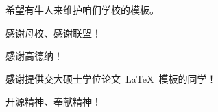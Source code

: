 
\begin{thanks}

  {\color{red} 希望有牛人来维护咱们学校的模板。}

  感谢母校、感谢联盟！

  感谢高德纳！

  感谢提供交大硕士学位论文~\LaTeX~模板的同学！

  开源精神、奉献精神！

  \vskip 20mm
 {
  \hspace{80mm} 

  \hspace{80mm} 

  \hspace{80mm}  }
\end{thanks}
